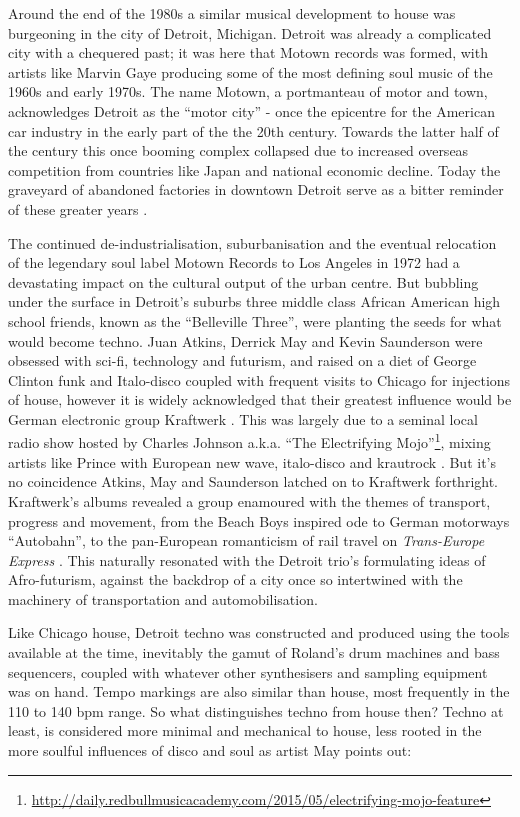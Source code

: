 Around the end of the 1980s a similar musical development to house was burgeoning in the city of Detroit, Michigan. Detroit was already a complicated city with a chequered past; it was here that Motown records was formed, with artists like Marvin Gaye producing some of the most defining soul music of the 1960s and early 1970s. The name Motown, a portmanteau of motor and town,  acknowledges Detroit  as the “motor city” - once the epicentre for the American car industry in the early part of the the 20th century. Towards the latter half of the century this once booming complex collapsed due to increased overseas competition from countries like Japan and national economic decline. Today the graveyard of abandoned factories in downtown Detroit serve as a bitter reminder of these greater years \citep{Sicko2010}.

The continued de-industrialisation, suburbanisation and the eventual relocation of the legendary soul label Motown Records to Los Angeles in 1972 had a devastating impact on the cultural output of the urban centre. But bubbling under the surface in Detroit's suburbs three middle class African American high school friends, known as the “Belleville Three”,  were planting the seeds for what would become techno. Juan Atkins, Derrick May and Kevin Saunderson were obsessed with sci-fi, technology and futurism, and raised on a diet of George Clinton funk and Italo-disco coupled with frequent visits to Chicago for injections of house, however it is widely acknowledged that their greatest influence would be German electronic group Kraftwerk \citep{Pope2011}. This was largely due to a seminal local radio show hosted by Charles Johnson a.k.a. “The Electrifying Mojo”\footnote{\url{http://daily.redbullmusicacademy.com/2015/05/electrifying-mojo-feature}}, mixing artists like Prince with European new wave, italo-disco and krautrock \citep{Reynolds2013, Sicko2010}. But it’s no coincidence Atkins, May and Saunderson latched on to Kraftwerk forthright. Kraftwerk’s albums revealed a group enamoured with the themes of transport, progress and movement, from the Beach Boys inspired ode to German motorways  “Autobahn”, to the pan-European romanticism of rail travel on \textit{Trans-Europe Express} \citep{Albiez2010}. This naturally resonated with the Detroit trio’s formulating ideas of Afro-futurism, against the backdrop of a city once so intertwined with the machinery of transportation and automobilisation.

Like Chicago house, Detroit techno was constructed and produced using the tools available at the time, inevitably the gamut of Roland’s drum machines and bass sequencers, coupled with whatever other synthesisers and sampling equipment was on hand. Tempo markings are also similar than house, most frequently in the 110 to 140 bpm range. So what distinguishes techno from house then? Techno at least, is considered more minimal and mechanical to house, less rooted in the more soulful influences of disco and soul as artist May points out:  

